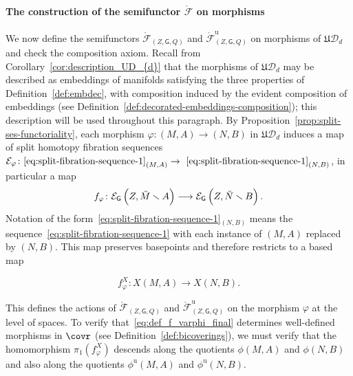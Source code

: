 \documentclass[AHL,Unicode,published]{cedram}
\newcommand{\Int}{\mathring}
\newcommand{\unt}{\mathrm{u}}
\newcommand{\fU}{\ensuremath{\mathfrak{U}}}
\newcommand{\sG}{\mathsf{G}}
\newcommand{\cD}{\mathcal{D}}
\newcommand{\cE}{\mathcal{E}}
\newcommand{\cF}{\mathcal{F}}
\newcommand{\too}{\ensuremath{\longrightarrow}}
\begin{document}
\paragraph*{The construction of the semifunctor $\Int{\cF}$ on morphisms}
We now define the semifunctors $\Int{\cF}_{(Z,\sG,Q)}$ and $\Int{\cF}^{\unt}_{(Z,\sG,Q)}$ on morphisms of $\fU\cD_{d}$ and check the composition axiom. Recall from Corollary~\ref{cor:description_UD_{d}} that the morphisms of $\fU\cD_{d}$ may be described as embeddings of manifolds satisfying the three properties of Definition~\ref{def:embdec}, with composition induced by the evident composition of embeddings (see Definition~\ref{def:decorated-embeddings-composition}); this description will be used throughout this paragraph. By Proposition~\ref{prop:split-ses-functoriality}, each morphism $\varphi \colon (M,A) \to (N,B)$ in $\fU\cD_{d}$ induces a map of split homotopy fibration sequences $\cE_{\varphi}\colon\eqref{eq:split-fibration-sequence-1}_{(M,A)} \to~\eqref{eq:split-fibration-sequence-1}_{(N,B)}$, in particular a map
\[
f_{\varphi} \colon \cE_{\sG}\left(Z,\Breve{M}\smallsetminus A\right) \too \cE_{\sG}\left(Z,\Breve{N}\smallsetminus B\right).
\]
Notation of the form~\eqref{eq:split-fibration-sequence-1}$_{(N,B)}$ means the sequence~\eqref{eq:split-fibration-sequence-1} with each instance of $(M,A)$ replaced by $(N,B)$. This map preserves basepoints and therefore restricts to a based map

\begin{equation}\label{eq:def_f_varphi_final}
f^{X}_{\varphi} \colon X(M,A) \too X(N,B).
\end{equation}

This defines the actions of $\Int{\cF}_{(Z,\sG,Q)}$ and $\Int{\cF}^{\unt}_{(Z,\sG,Q)}$ on the morphism $\varphi$ at the level of spaces. To verify that~\eqref{eq:def_f_varphi_final} determines well-defined morphisms in $\covr$ (see Definition~\ref{def:bicoverings}), we must verify that the homomorphism $\pi_{1}(f^X_\varphi)$ descends along the quotients $\phi(M,A)$ and $\phi(N,B)$ and also along the quotients $\phi^{\unt}(M,A)$ and $\phi^{\unt}(N,B)$.
\end{document}
